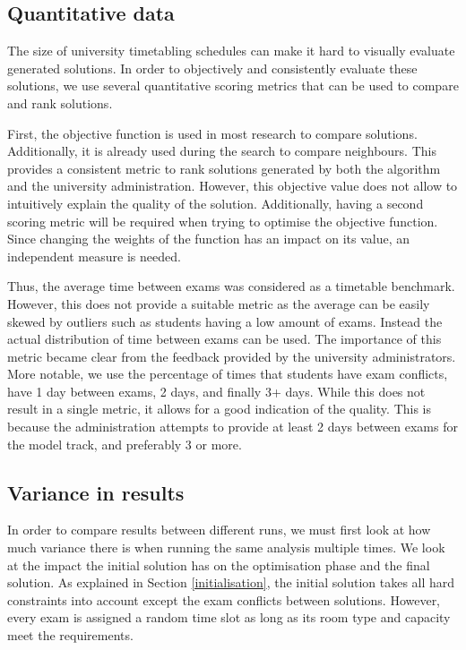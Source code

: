 \subsection{Quantitative data} \label{quantitative}

The size of university timetabling schedules can make it hard to visually evaluate generated solutions. In order to objectively and consistently evaluate these solutions, we use several quantitative scoring metrics that can be used to compare and rank solutions.

First, the objective function is used in most research to compare solutions. Additionally, it is already used during the search to compare neighbours. This provides a consistent metric to rank solutions generated by both the algorithm and the university administration. However, this objective value does not allow to intuitively explain the quality of the solution. Additionally, having a second scoring metric will be required when trying to optimise the objective function. Since changing the weights of the function has an impact on its value, an independent measure is needed.

Thus, the average time between exams was considered as a timetable benchmark. However, this does not provide a suitable metric as the average can be easily skewed by outliers such as students having a low amount of exams. Instead the actual distribution of time between exams can be used. The importance of this metric became clear from the feedback provided by the university administrators. More notable, we use the percentage of times that students have exam conflicts, have 1 day between exams, 2 days, and finally 3+ days. While this does not result in a single metric, it allows for a good indication of the quality. This is because the administration attempts to provide at least 2 days between exams for the model track, and preferably 3 or more.

\subsection{Variance in results} \label{initial}

In order to compare results between different runs, we must first look at how much variance there is when running the same analysis multiple times. We look at the impact the initial solution has on the optimisation phase and the final solution. As explained in Section \ref{initialisation}, the initial solution takes all hard constraints into account except the exam conflicts between solutions. However, every exam is assigned a random time slot as long as its room type and capacity meet the requirements.


